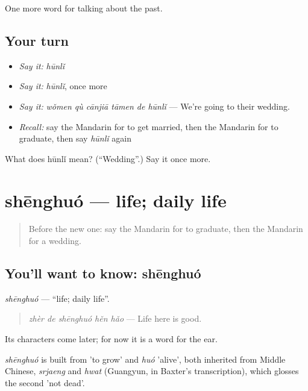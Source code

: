 \begin{grammarlens}[title={What you've built}]
One more word for talking about the past.
\end{grammarlens}

\subsection*{Your turn}
\begin{itemize}
\raggedright
  \item \emph{Say it:} \emph{hūnlǐ}
  \item \emph{Say it:} \emph{hūnlǐ}, once more
  \item \emph{Say it:} \emph{wǒmen qù cānjiā tāmen de hūnlǐ} — We're going to their wedding.
  \item \emph{Recall:} say the Mandarin for to get married, then the Mandarin for to graduate, then say \emph{hūnlǐ} again
\end{itemize}

\begin{tcolorbox}[breakable,colback=teal!4,colframe=teal!35!black,title={Before you move on}]
What does hūnlǐ mean? (\textquotedblleft{}Wedding\textquotedblright{}.) Say it once more.
\end{tcolorbox}
\section[shēnghuó]{shēnghuó — life; daily life}

\label{lesson:ZH-C254-shenghuo}



\begin{quote}
Before the new one: say the Mandarin for to graduate, then the Mandarin for a wedding.
\end{quote}

\subsection*{You'll want to know: shēnghuó}
\emph{shēnghuó} — \textquotedblleft{}life; daily life\textquotedblright{}.

\begin{quote}
\emph{zhèr de shēnghuó hěn hǎo} — Life here is good.
\end{quote}

Its characters come later; for now it is a word for the ear.

\begin{cousinweb}
\emph{shēnghuó} is built from  'to grow' and \emph{huó} 'alive', both inherited from Middle Chinese, \emph{srjaeng} and \emph{hwat} (Guangyun, in Baxter's transcription), which glosses the second 'not dead'.
\end{cousinweb}

